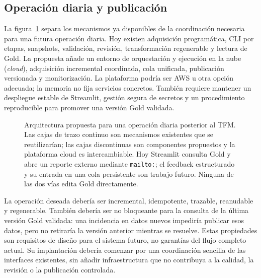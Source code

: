 \subsection{Operación diaria y publicación}

La figura~\ref{fig:operacion-diaria-futura} separa los mecanismos ya
disponibles de la coordinación necesaria para una futura operación diaria. Hoy
existen adquisición programática, CLI por etapas, snapshots, validación,
revisión, transformación regenerable y lectura de Gold. La propuesta añade un
entorno de orquestación y ejecución en la nube (\emph{cloud}), adquisición incremental coordinada,
cola unificada, publicación versionada y monitorización. La plataforma podría
ser AWS u otra opción adecuada; la memoria no fija servicios concretos.
También requiere mantener un despliegue estable de
Streamlit, gestión segura de secretos y un procedimiento reproducible para
promover una versión Gold validada.

\begin{figure}[p]
\centering

\caption[Propuesta de operación diaria posterior al TFM]{Arquitectura propuesta
para una operación diaria posterior al TFM. Las cajas de trazo continuo son
mecanismos existentes que se reutilizarían; las cajas discontinuas son
componentes propuestos y la plataforma cloud es intercambiable. Hoy Streamlit
consulta Gold y abre un reporte externo mediante \texttt{mailto:}; el feedback
estructurado y su entrada en una cola persistente son trabajo futuro. Ninguna
de las dos vías edita Gold directamente.}
\label{fig:operacion-diaria-futura}
\end{figure}

La operación deseada debería ser incremental, idempotente, trazable, reanudable
y regenerable. También debería ser no bloqueante para la consulta de la última
versión Gold validada: una incidencia en datos nuevos impediría publicar esos
datos, pero no retiraría la versión anterior mientras se resuelve. Estas
propiedades son requisitos de diseño para el sistema futuro, no garantías del
flujo completo actual. Su implantación debería comenzar por una coordinación
sencilla de las interfaces existentes, sin añadir infraestructura que no
contribuya a la calidad, la revisión o la publicación controlada.
